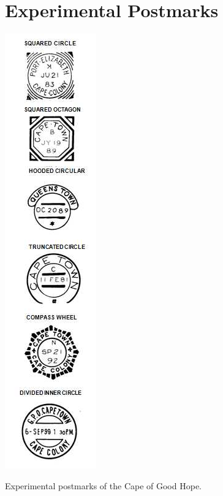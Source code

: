 \chapter{Experimental Postmarks}
\begin{marginfigure}
\includegraphics[width=.85\textwidth]{../cape-of-good-hope/experimental.jpg}
\caption{Experimental postmarks of the Cape of Good Hope.}
\end{marginfigure}	
